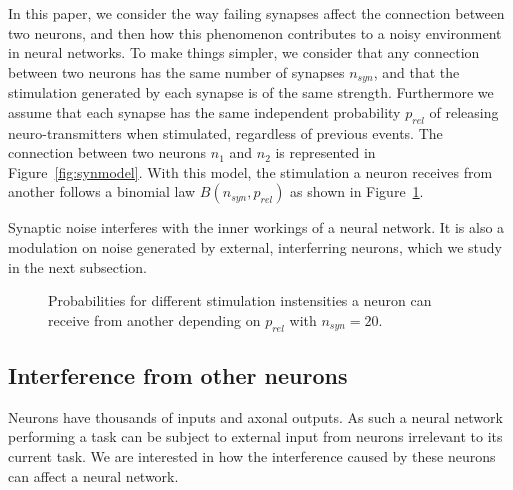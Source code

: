 \documentclass[journal]{IEEEtran}
\begin{document}
In this paper, we consider the way failing synapses affect the connection between two neurons, and then how this phenomenon contributes to a noisy environment in neural networks. To make things simpler, we consider that any connection between two neurons has the same number of synapses $n_{syn}$, and that the stimulation generated by each synapse is of the same strength. Furthermore we assume that each synapse has the same independent probability $p_{rel}$ of releasing neuro-transmitters when stimulated, regardless of previous events. The connection between two neurons $n_1$ and $n_2$ is represented in Figure~\ref{fig:synmodel}. With this model, the stimulation a neuron receives from another follows a binomial law $B(n_{syn}, p_{rel})$ as shown in Figure~\ref{fig:binomial}.

Synaptic noise interferes with the inner workings of a neural network. It is also a modulation on noise generated by external, interferring neurons, which we study in the next subsection. 

\begin{figure}
\caption{Probabilities for different stimulation instensities a neuron can receive from another depending on $p_{rel}$ with $n_{syn}=20$.}
\label{fig:binomial}
\end{figure}

\subsection{Interference from other neurons}

Neurons have thousands of inputs and axonal outputs. As such a neural network performing a task can be subject to external input from neurons irrelevant to its current task. We are interested in how the interference caused by these neurons can affect a neural network.
\end{document}
